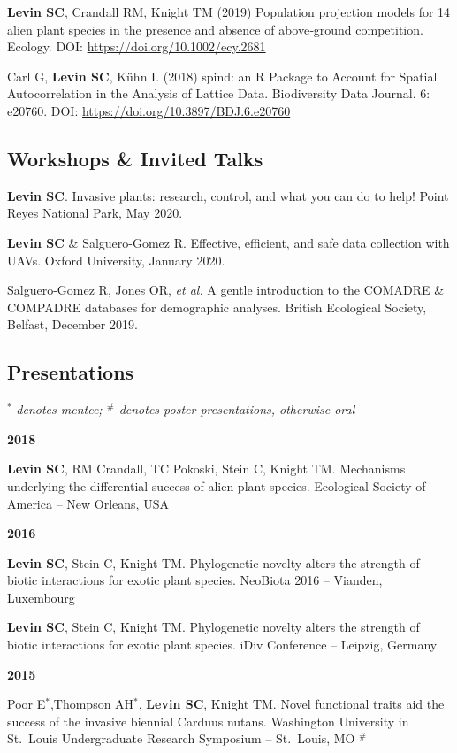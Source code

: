\documentclass[11pt,]{article}
\begin{document}
\textbf{Levin SC}, Crandall RM, Knight TM (2019) Population projection
models for 14 alien plant species in the presence and absence of
above‐ground competition. Ecology. DOI:
\url{https://doi.org/10.1002/ecy.2681}

Carl G, \textbf{Levin SC}, Kühn I. (2018) spind: an R Package to Account
for Spatial Autocorrelation in the Analysis of Lattice Data.
Biodiversity Data Journal. 6: e20760. DOI:
\url{https://doi.org/10.3897/BDJ.6.e20760}

\hypertarget{workshops-invited-talks}{%
\subsection{Workshops \& Invited Talks}\label{workshops-invited-talks}}

\textbf{Levin SC}. Invasive plants: research, control, and what you can
do to help! Point Reyes National Park, May 2020.

\textbf{Levin SC} \& Salguero-Gomez R. Effective, efficient, and safe
data collection with UAVs. Oxford University, January 2020.

Salguero-Gomez R, Jones OR, \emph{et al.} A gentle introduction to the
COMADRE \& COMPADRE databases for demographic analyses. British
Ecological Society, Belfast, December 2019.

\hypertarget{presentations}{%
\subsection{Presentations}\label{presentations}}

\(^\ast\) \emph{denotes mentee; \(^\#\) denotes poster presentations,
otherwise oral}

\textbf{2018}

\textbf{Levin SC}, RM Crandall, TC Pokoski, Stein C, Knight TM.
Mechanisms underlying the differential success of alien plant species.
Ecological Society of America -- New Orleans, USA

\textbf{2016}

\textbf{Levin SC}, Stein C, Knight TM. Phylogenetic novelty alters the
strength of biotic interactions for exotic plant species. NeoBiota 2016
-- Vianden, Luxembourg

\textbf{Levin SC}, Stein C, Knight TM. Phylogenetic novelty alters the
strength of biotic interactions for exotic plant species. iDiv
Conference -- Leipzig, Germany

\textbf{2015}

Poor E\(^\ast\),Thompson AH\(^\ast\), \textbf{Levin SC}, Knight TM.
Novel functional traits aid the success of the invasive biennial Carduus
nutans. Washington University in St.~Louis Undergraduate Research
Symposium -- St.~Louis, MO \(^\#\)
\end{document}
